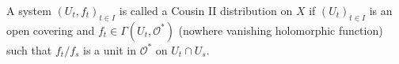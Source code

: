 A system $(U_t, f_t)_{t \in I}$ is called a Cousin II distribution on $X$ if $(U_t)_{t \in I}$ is an open covering and $f_t \in \Gamma(U_t, \mathcal{O}^*)$ (nowhere vanishing holomorphic function) such that $f_t/f_s$ is a unit in $\mathcal{O}^*$ on $U_t \cap U_s$.
